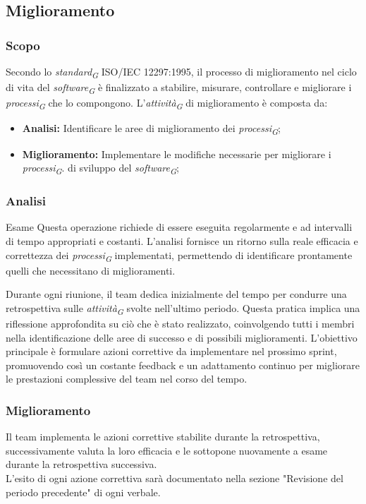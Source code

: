 \subsection{Miglioramento}
\subsubsection{Scopo}
Secondo lo \textit{standard}\textsubscript{\textit{G}} ISO/IEC 12297:1995, il processo di miglioramento nel ciclo di vita del \textit{software}\textsubscript{\textit{G}} è finalizzato a stabilire, misurare, controllare e migliorare i \textit{processi}\textsubscript{\textit{G}} che lo compongono.
L'\textit{attività}\textsubscript{\textit{G}} di miglioramento è composta da:  
 \begin{itemize}
    \item \textbf{Analisi:} Identificare le aree di miglioramento dei \textit{processi}\textsubscript{\textit{G}}; 
    \item  \textbf{Miglioramento:} Implementare le modifiche necessarie per migliorare i \textit{processi}\textsubscript{\textit{G}}. 
    di sviluppo del \textit{software}\textsubscript{\textit{G}};
 \end{itemize}
 \subsubsection{Analisi}
 Esame 
Questa operazione richiede di essere eseguita regolarmente e ad intervalli di tempo appropriati e costanti. L'analisi fornisce un ritorno sulla reale efficacia e correttezza dei \textit{processi}\textsubscript{\textit{G}} implementati, permettendo di identificare prontamente quelli che necessitano di miglioramenti.

\vspace*{0.1cm}

Durante ogni riunione, il team dedica inizialmente del tempo per condurre una retrospettiva sulle \textit{attività}\textsubscript{\textit{G}} svolte nell'ultimo periodo. Questa pratica implica una riflessione approfondita su ciò che è stato realizzato, coinvolgendo tutti i membri nella identificazione delle aree di successo e di possibili miglioramenti. L'obiettivo principale è formulare azioni correttive da implementare nel prossimo sprint, promuovendo così un costante feedback e un adattamento continuo per migliorare le prestazioni complessive del team nel corso del tempo. 
 \subsubsection{Miglioramento}
 Il team implementa le azioni correttive stabilite durante la retrospettiva, successivamente valuta la loro efficacia e le sottopone nuovamente a esame durante la retrospettiva successiva.\\
L'esito di ogni azione correttiva sarà documentato nella sezione "Revisione del periodo precedente" di ogni verbale. 
